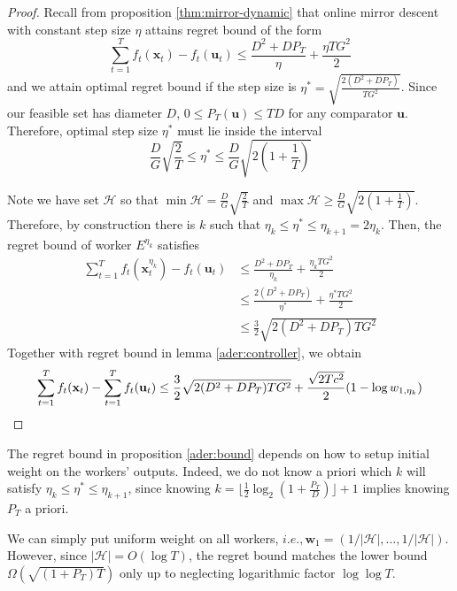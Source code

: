 \documentclass[12pt, a4paper]{report}
\begin{document}
\begin{proof}
Recall from proposition \ref{thm:mirror-dynamic} that online mirror descent with constant step size $\eta$ attains regret bound of the form
\begin{equation*}
    \sum_{t=1}^T f_t(\mathbf{x}_t) - f_t(\mathbf{u}_t) \leq \frac{D^2 + DP_T}{\eta} + \frac{\eta TG^2}{2}
\end{equation*}
and we attain optimal regret bound if the step size is $\eta^* = \sqrt{\frac{2(D^2 + DP_T)}{TG^2}}$. 
Since our feasible set has diameter $D$, $0 \leq P_T(\mathbf{u}) \leq TD$ for any comparator $\mathbf{u}$. Therefore, optimal step size $\eta^*$ must lie inside the interval
\begin{equation*}
    \frac{D}{G}\sqrt{\frac{2}{T}} \leq \eta^* \leq \frac{D}{G}\sqrt{2\left(1 + \frac{1}{T}\right)}
\end{equation*}

Note we have set $\mathcal{H}$ so that $\min \mathcal{H} = \frac{D}{G}\sqrt{\frac{2}{T}}$ and $\max \mathcal{H} \geq \frac{D}{G}\sqrt{2 \left(1 + \frac{1}{T}\right)}$. Therefore, by construction there is $k$ such that $\eta_k \leq \eta^* \leq \eta_{k+1} = 2\eta_k$. Then, the regret bound of worker $E^{\eta_k}$ satisfies
\begin{align*}
    \sum_{t=1}^T f_t(\mathbf{x}_t^{\eta_k}) - f_t(\mathbf{u}_t) &\leq \frac{D^2 + DP_T}{\eta_k} + \frac{\eta_k TG^2}{2}
    \\
    &\leq \frac{2(D^2 + DP_T)}{\eta^*} + \frac{\eta^* TG^2}{2}
    \\
    &\leq \frac{3}{2}\sqrt{2(D^2 + DP_T)TG^2}
\end{align*}
Together with regret bound in lemma \ref{ader:controller}, we obtain 
\begin{equation*}
    \sum_{t=1}^T f_t(\mathbf{x}_t) - \sum_{t=1}^T f_t(\mathbf{u}_t) \leq \frac{3}{2}\sqrt{2(D^2 + DP_T)TG^2} + \frac{\sqrt{2Tc^2}}{2}(1 - \log w_{1, \eta_k}) \qedhere
\end{equation*}
\end{proof}

The regret bound in proposition \ref{ader:bound} depends on how to setup initial weight on the workers' outputs. Indeed, we do not know a priori which $k$ will satisfy $\eta_k \leq \eta^* \leq \eta_{k+1}$, since knowing $k = \lfloor \frac{1}{2} \log_2 (1+ \frac{P_T}{D}) \rfloor + 1$ implies knowing $P_T$ a priori. 

We can simply put uniform weight on all workers, $i.e., \mathbf{w}_1 = (1/|\mathcal{H}|, \dots, 1 / |\mathcal{H}|)$. However, since $|\mathcal{H}| = O(\log T)$, the regret bound matches the lower bound $\Omega(\sqrt{(1+P_T)T})$ only up to neglecting logarithmic factor $\log \log T$.
\end{document}
